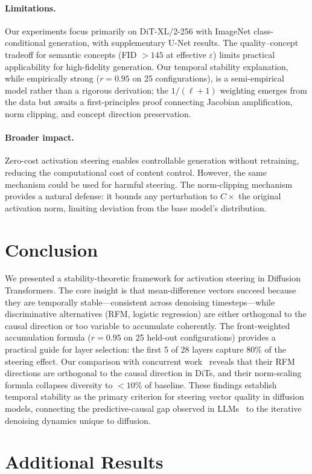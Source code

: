 \documentclass{article}
\theoremstyle{definition}
\begin{document}
\paragraph{Limitations.}
Our experiments focus primarily on DiT-XL/2-256 with ImageNet class-conditional generation, with supplementary U-Net results.
The quality--concept tradeoff for semantic concepts (FID $>145$ at effective $\varepsilon$) limits practical applicability for high-fidelity generation.
Our temporal stability explanation, while empirically strong ($r = 0.95$ on 25 configurations), is a semi-empirical model rather than a rigorous derivation; the $1/(\ell+1)$ weighting emerges from the data but awaits a first-principles proof connecting Jacobian amplification, norm clipping, and concept direction preservation.

\paragraph{Broader impact.}
Zero-cost activation steering enables controllable generation without retraining, reducing the computational cost of content control.
However, the same mechanism could be used for harmful steering.
The norm-clipping mechanism provides a natural defense: it bounds any perturbation to $C \times$ the original activation norm, limiting deviation from the base model's distribution.

\section{Conclusion}

We presented a stability-theoretic framework for activation steering in Diffusion Transformers.
The core insight is that mean-difference vectors succeed because they are temporally stable---consistent across denoising timesteps---while discriminative alternatives (RFM, logistic regression) are either orthogonal to the causal direction or too variable to accumulate coherently.
The front-weighted accumulation formula ($r = 0.95$ on 25 held-out configurations) provides a practical guide for layer selection: the first 5 of 28 layers capture 80\% of the steering effect.
Our comparison with concurrent work~\citep{wang2026general} reveals that their RFM directions are orthogonal to the causal direction in DiTs, and their norm-scaling formula collapses diversity to $<10\%$ of baseline.
These findings establish temporal stability as the primary criterion for steering vector quality in diffusion models, connecting the predictive-causal gap observed in LLMs~\citep{marks2024geometry} to the iterative denoising dynamics unique to diffusion.




\appendix
\section{Additional Results}

\end{document}
